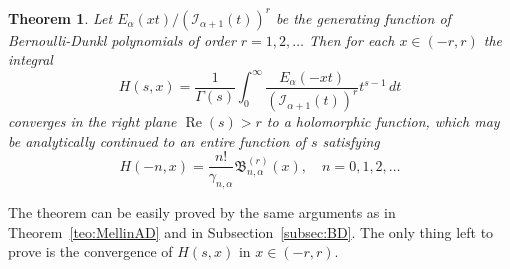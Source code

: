 \documentclass[a4paper]{amsart}
\newcommand{\I}{\mathcal{I}}
\newcommand{\Ea}{E_{\alpha}}
\newcommand{\B}{\mathfrak{B}}
\renewcommand{\Re}{\operatorname{Re}}
\theoremstyle{plain}
\newtheorem{theorem}{Theorem}[section]
\theoremstyle{definition}
\theoremstyle{remark}
\numberwithin{equation}{section}
\begin{document}
\begin{theorem}
\label{teo:genBD}
Let $\Ea(xt)/(\I_{\alpha+1}(t))^r$ be the generating function of Bernoulli-Dunkl polynomials of order $r=1,2,\dots$ Then for each $x \in (-r,r)$ the integral
\begin{equation}
\label{eq:mellinBDr}
H(s,x) = \frac{1}{\Gamma(s)} \int_{0}^{\infty} 
\frac{\Ea(-xt)}{\left(\I_{\alpha+1}(t)\right)^r} t^{s-1} \,dt
\end{equation} 
converges in the right plane $\Re(s) > r$ to a holomorphic function, which may be analytically continued to an entire function of $s$ satisfying
\begin{equation*}
  H(-n,x) = \frac{n!}{\gamma_{n,\alpha}} \B_{n,\alpha}^{(r)}(x),\quad n=0,1,2,\dots
\end{equation*}
\end{theorem}

The theorem can be easily proved by the same arguments as in Theorem~\ref{teo:MellinAD} and in Subsection~\ref{subsec:BD}. The only thing left to prove is the convergence of $H(s,x)$ in $x \in (-r,r)$.
\end{document}

